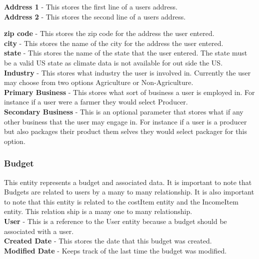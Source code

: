 \documentclass[onecolumn, draftclsnofoot,10pt, compsoc]{article}
\begin{document}
				\textbf{Address 1} - This  stores the first line of a users address.\\

				\textbf{Address 2} - This stores the second line of a users address.

				\textbf{zip code} - This stores the zip code for the address the user entered.\\

				\textbf{city} - This stores the name of the city for the address the user entered.\\

				\textbf{state} - This stores the name of the state that the user entered. The state must be a valid US state as climate data is not available for out side the US.\\

				\textbf{Industry} - This stores what industry the user is involved in. Currently the user may choose from two options Agriculture or Non-Agriculture.\\

				\textbf{Primary Business} - This stores what sort of business a user is employed in. For instance if a user were a farmer they would select Producer.\\

				\textbf{Secondary Business} - This is an optional parameter that stores what if any other business that the user may engage in. For instance if a user is a producer but also packages their product them selves they would select packager for this option.\\

			\subsubsection{Budget}
				This entity represents a budget and associated data. It is important to note that Budgets are related to users by a many to many relationship. It is also important to note that this entity is related to the costItem entity and the IncomeItem entity. This relation ship is a many one to many relationship.\\
				\textbf{User} - This is a reference to the User entity because a budget should be associated with a user.\\

				\textbf{Created Date} - This stores the date that this budget was created.\\

				\textbf{Modified Date} - Keeps track of the last time the budget was modified.\\
\end{document}
